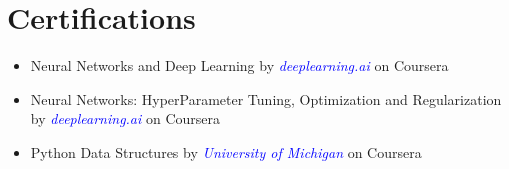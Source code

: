 \documentclass[letterpaper,11pt]{article}
\begin{document}
\section{Certifications}
\begin{itemize}[noitemsep,nolistsep,leftmargin=*]
\item Neural Networks and Deep Learning by \textcolor{blue}{\textit{deeplearning.ai}} on Coursera\item Neural Networks: HyperParameter Tuning, Optimization and Regularization by \textcolor{blue}{\textit{deeplearning.ai}} on Coursera
\item Python Data Structures by \textcolor{blue}{\textit{University of Michigan}} on Coursera
 
 \end{itemize}
 

 
 
 
\end{document}
